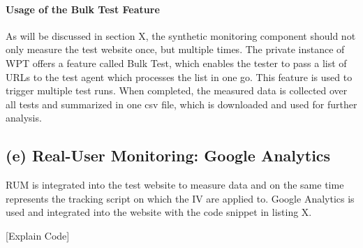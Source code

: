 
\paragraph{Usage of the Bulk Test Feature}

As will be discussed in section X, the synthetic monitoring component should not only measure the test website once, but multiple times.
The private instance of WPT offers a feature called Bulk Test, which enables the tester to pass a list of URLs to the test agent which processes the list in one go.
This feature is used to trigger multiple test runs.
When completed, the measured data is collected over all tests and summarized in one csv file, which is downloaded and used for further analysis.





\subsection{(e) Real-User Monitoring: Google Analytics}

RUM is integrated into the test website to measure data and on the same time represents the tracking script on which the IV are applied to.
Google Analytics is used and integrated into the website with the code snippet in listing X.


[Explain Code]






